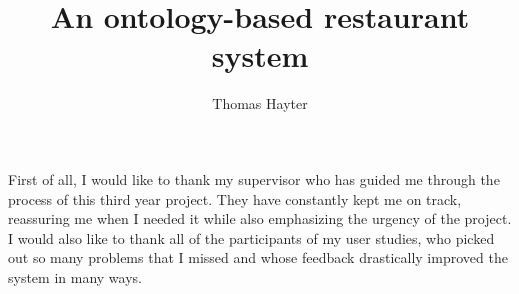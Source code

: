 \documentclass[12pt,BSc,wordcount,twoside,anon]{muthesis}
\begin{document}

\title{An ontology-based restaurant system}
\author{Thomas Hayter}

\beforeabstract



\afterabstract

First of all, I would like to thank my supervisor who has guided me through the process of this third year project. They have constantly kept me on track, reassuring me when I needed it while also emphasizing the urgency of the project.
I would also like to thank all of the participants of my user studies, who picked out so many problems that I missed and whose feedback drastically improved the system in many ways.
\afterpreface












\appendix

\end{document}
